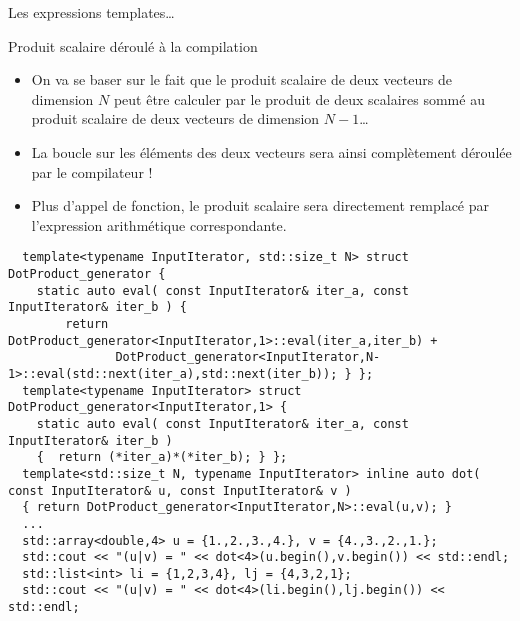 \documentclass[compress,10pt,aspectratio=169]{beamer}
\begin{document}
  \begin{frame}[fragile]{Les expressions templates\ldots}
    \scriptsize\vspace*{-4mm}
    \begin{exampleblock}{\small Produit scalaire déroulé à la compilation}
  \begin{itemize}
  \item On va se baser sur le fait que le produit scalaire de deux vecteurs de dimension $N$ peut être calculer par le produit de deux scalaires sommé au produit scalaire de deux vecteurs de dimension $N-1$\ldots
  \item La boucle sur les éléments des deux vecteurs sera ainsi complètement déroulée par le compilateur !
  \item Plus d'appel de fonction, le produit scalaire sera directement remplacé par l'expression arithmétique correspondante.
  \end{itemize}
  \begin{verbatim}
  template<typename InputIterator, std::size_t N> struct DotProduct_generator {
    static auto eval( const InputIterator& iter_a, const InputIterator& iter_b ) {
        return DotProduct_generator<InputIterator,1>::eval(iter_a,iter_b) + 
               DotProduct_generator<InputIterator,N-1>::eval(std::next(iter_a),std::next(iter_b)); } };
  template<typename InputIterator> struct DotProduct_generator<InputIterator,1> {
    static auto eval( const InputIterator& iter_a, const InputIterator& iter_b ) 
    {  return (*iter_a)*(*iter_b); } };
  template<std::size_t N, typename InputIterator> inline auto dot( const InputIterator& u, const InputIterator& v ) 
  { return DotProduct_generator<InputIterator,N>::eval(u,v); }
  ...
  std::array<double,4> u = {1.,2.,3.,4.}, v = {4.,3.,2.,1.};
  std::cout << "(u|v) = " << dot<4>(u.begin(),v.begin()) << std::endl;
  std::list<int> li = {1,2,3,4}, lj = {4,3,2,1};
  std::cout << "(u|v) = " << dot<4>(li.begin(),lj.begin()) << std::endl;
  \end{verbatim}
  \end{exampleblock}
  \end{frame}
\end{document}
